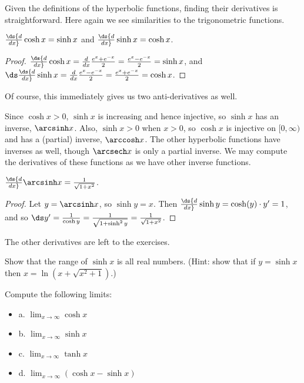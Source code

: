 \begin{theorem}
Given the definitions of the hyperbolic functions, finding their
derivatives is straightforward. Here again we see similarities to the
trigonometric functions.

\begin{theorem} $\ds{d\over dx}\cosh x=\sinh x $ and 
\label{thm:hyperbolic derivatives}
$\ds{d\over dx}\sinh x = \cosh x $.
\begin{proof}
$\ds{d\over dx}\cosh x= {d\over dx}{e^x +e^{-x}\over 2} = 
{e^x- e^{-x}\over 2} =\sinh x$, and 
$\ds\ds{d\over dx}\sinh x = {d\over dx}{e^x -e^{-x}\over 2} = 
{e^x +e^{-x }\over 2} =\cosh x$.
\end{proof}

Of course, this immediately gives us two anti-derivatives as well.

Since $\cosh x > 0$, $\sinh x$ is increasing and hence injective, so
$\sinh x$ has an inverse, $\arcsinh x$. Also, $\sinh x > 0$ when
$x>0$, so $\cosh x$ is injective on $[0,\infty)$ and has a (partial)
inverse, $\arccosh x$. The other hyperbolic functions have inverses
as well, though $\arcsech x$ is only a partial inverse. 
We may compute the derivatives of these functions as we have other
inverse functions.

\begin{theorem} $\ds{d\over dx}\arcsinh x = {1\over\sqrt{1+x^2}}$.
\begin{proof}
Let $y=\arcsinh x$, so $\sinh y=x$. Then 
$\ds{d\over dx}\sinh y = \cosh(y)\cdot y'  = 1$, and
so $\ds y' ={1\over\cosh y} ={1\over\sqrt{1 +\sinh^2 y}} =
{1\over\sqrt{1+x^2}}$.
\end{proof}

The other derivatives are left to the exercises.


\begin{exercises}

\exercise Show that the range of $\sinh x$ is all real
numbers. (Hint: show that if $y=\sinh x $ then 
$x =\ln (x+\sqrt{x^2+1})$.) 

\exercise Compute the following limits:
\begin{itemize} %

\item{a.} $ \lim_{x\to \infty } \cosh x$
\item{b.} $ \lim_{x\to \infty } \sinh x$
\item{c.} $ \lim_{x\rightarrow \infty } \tanh x$
\item{d.} $ \lim_{x\rightarrow \infty } (\cosh x -\sinh x)$


\end{itemize}
\end{exercises}
\end{theorem}
\end{theorem}
\end{theorem}
